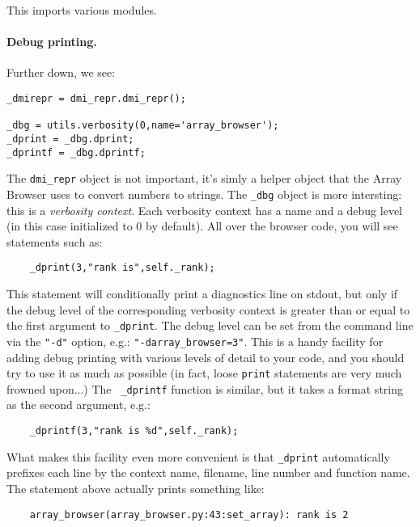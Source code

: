 \documentclass[12pt,twoside]{book}
\begin{document}
  This imports various modules. 
  
\paragraph{Debug printing.} Further down, we see:
  
\begin{verbatim}  
_dmirepr = dmi_repr.dmi_repr();

_dbg = utils.verbosity(0,name='array_browser');
_dprint = _dbg.dprint;
_dprintf = _dbg.dprintf;
\end{verbatim}
  
  The {\tt dmi\_repr} object is not important, it's simly a helper object that
  the Array Browser uses to convert numbers to strings. The {\tt \_dbg} object
  is more intersting: this is a {\em verbosity context}. Each verbosity context
  has a name and a debug level (in this case initialized to 0 by default).
  All over the browser code, you will see statements such as:

\begin{verbatim} 
    _dprint(3,"rank is",self._rank);
\end{verbatim}

  This statement will conditionally print a diagnostics line on stdout, but only
  if the debug level of the corresponding verbosity context is greater than or
  equal to the first argument to {\tt \_dprint}. The debug level can be set from
  the command line via the {\tt "-d"} option, e.g.: {\tt "-darray_browser=3"}.
  This is a handy facility for adding debug printing with various levels of
  detail to your code, and you should try to use it as much as possible (in
  fact, loose {\tt print} statements are very much frowned upon...) The {\tt
  \_dprintf} function is similar, but it takes a format string as the second
  argument, e.g.:

\begin{verbatim}  
    _dprintf(3,"rank is %d",self._rank);
\end{verbatim}

  What makes this facility even more convenient is that {\tt \_dprint}
  automatically prefixes each line by the context name, filename, line number
  and function name. The statement above actually prints something like:

\begin{verbatim}  
    array_browser(array_browser.py:43:set_array): rank is 2
\end{verbatim}
\end{document}
